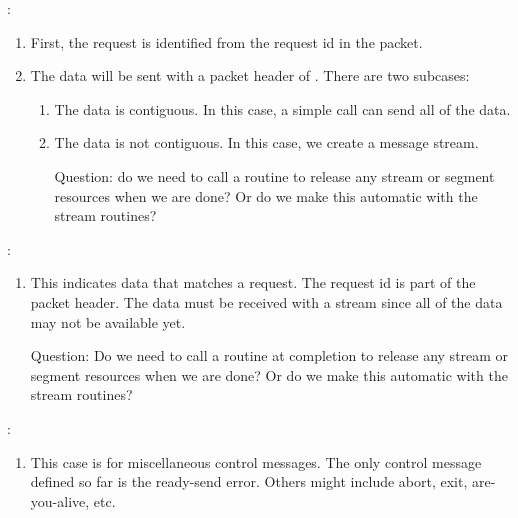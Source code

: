 :
\begin{enumerate}
\item First, the request is identified from the request id in the packet.

\item The data will be sent with a packet header of
  .  There are two subcases:
  \begin{enumerate}
  \item The data is contiguous.  In this case, a simple 
    call can send all of the data.

  \item The data is not contiguous.  In this case, we create a message
    stream.  

   Question: do we need to call a routine to release any stream or segment
   resources when we are done?  Or do we make this automatic with the stream
   routines? 

  \end{enumerate}
\end{enumerate}

:
\begin{enumerate}
\item This indicates data that matches a request.  The request id is part of
  the packet header.  The data must be received with a stream since all of the
  data may not be available yet.  

  Question: Do we need to call a routine at completion to release any stream
  or segment resources when we are done? Or do we make this automatic with the
  stream routines?

\end{enumerate}

:
\begin{enumerate}
\item This case is for miscellaneous control messages.  The only control
  message defined so far is the ready-send error.  Others might include abort,
  exit, are-you-alive, etc.
\end{enumerate}




